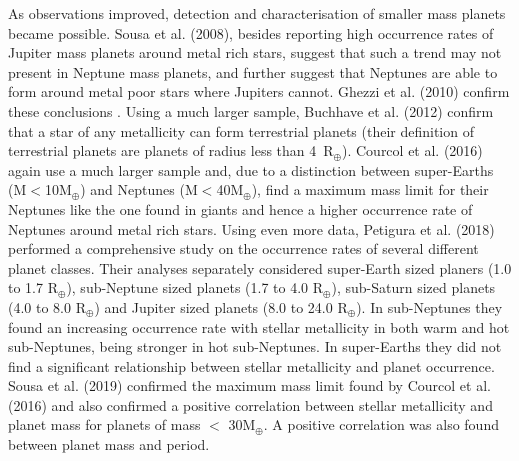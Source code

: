 \documentclass[a4paper,twocolumn,12pt]{article}
\begin{document}
As observations improved, detection and characterisation of smaller mass planets became possible. Sousa et al. (2008)\cite{Sousa.et.al.2008}, besides reporting high occurrence rates of Jupiter mass planets around metal rich stars, suggest that such a trend may not present in Neptune mass planets, and further suggest that Neptunes are able to form around metal poor stars where Jupiters cannot. Ghezzi et al. (2010) confirm these conclusions \cite{Ghezzi.et.al.2010}. Using a much larger sample, Buchhave et al. (2012)\cite{Buchhave.et.al.2012} confirm that a star of any metallicity can form terrestrial planets (their definition of terrestrial planets are planets of radius less than 4~R$_\oplus$). Courcol et al. (2016)\cite{Courcol.et.al.} again use a much larger sample and, due to a distinction between super-Earths (M$<$10M$_\oplus$) and Neptunes (M$<$40M$_\oplus$), find a maximum mass limit for their Neptunes like the one found in giants and hence a higher occurrence rate of Neptunes around metal rich stars. Using even more data, Petigura et al. (2018)\cite{Petigura.et.al.} performed a comprehensive study on the occurrence rates of several different planet classes. Their analyses separately considered super-Earth sized planers (1.0 to 1.7 R$_\oplus$), sub-Neptune sized planets (1.7 to 4.0 R$_\oplus$), sub-Saturn sized planets (4.0 to 8.0 R$_\oplus$) and Jupiter sized planets (8.0 to 24.0 R$_\oplus$). In sub-Neptunes they found an increasing occurrence rate with stellar metallicity in both warm and hot sub-Neptunes, being stronger in hot sub-Neptunes. In super-Earths they did not find a significant relationship between stellar metallicity and planet occurrence. Sousa et al. (2019)\cite{Sousa.et.al.} confirmed the maximum mass limit found by Courcol et al. (2016) and also confirmed a positive correlation between stellar metallicity and planet mass for planets of mass $<$ 30M$_\oplus$. A positive correlation was also found between planet mass and period.\\
\end{document}
